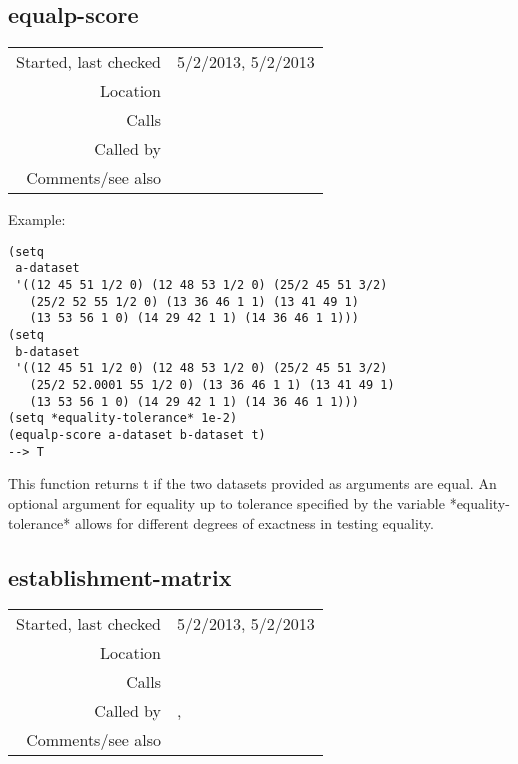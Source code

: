 \subsection*{equalp-score}\label{fun:equalp-score}

\vspace{0.3cm}
\begin{tabular}{r|p{8cm}}
Started, last checked & 5/2/2013, 5/2/2013 \\
Location & \nameref{sec:robust-metrics} \\
Calls & \\
Called by & \nameref{fun:score-matrix} \\
Comments/see also &
\end{tabular}

\vspace{0.5cm}
\noindent Example:
\begin{verbatim}
(setq
 a-dataset
 '((12 45 51 1/2 0) (12 48 53 1/2 0) (25/2 45 51 3/2)
   (25/2 52 55 1/2 0) (13 36 46 1 1) (13 41 49 1)
   (13 53 56 1 0) (14 29 42 1 1) (14 36 46 1 1)))
(setq
 b-dataset
 '((12 45 51 1/2 0) (12 48 53 1/2 0) (25/2 45 51 3/2)
   (25/2 52.0001 55 1/2 0) (13 36 46 1 1) (13 41 49 1)
   (13 53 56 1 0) (14 29 42 1 1) (14 36 46 1 1)))
(setq *equality-tolerance* 1e-2)
(equalp-score a-dataset b-dataset t)
--> T
\end{verbatim}

\noindent This function returns t if the two datasets
provided as arguments are equal. An optional argument
for equality up to tolerance specified by the
variable *equality-tolerance* allows for different
degrees of exactness in testing equality.


\subsection*{establishment-matrix}\label{fun:establishment-matrix}

\vspace{0.3cm}
\begin{tabular}{r|p{8cm}}
Started, last checked & 5/2/2013, 5/2/2013 \\
Location & \nameref{sec:robust-metrics} \\
Calls & \\
Called by & \nameref{fun:establishment-metric},\newline \nameref{fun:occurrence-matrixnrel-idx} \\
Comments/see also &
\end{tabular}

